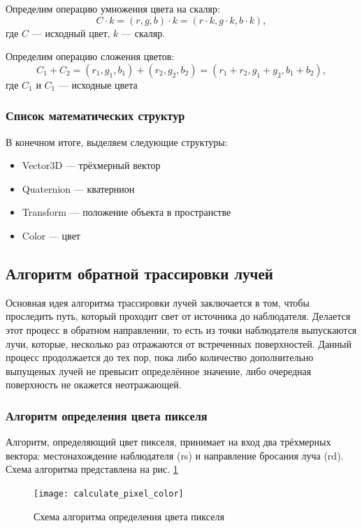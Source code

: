 Определим операцию умножения цвета на скаляр:
\begin{equation}
	C\cdot k=(r, g, b)\cdot k=(r\cdot k, g\cdot k, b\cdot k),
\end{equation}
где $C$ --- исходный цвет, $k$ --- скаляр.

Определим операцию сложения цветов:
\begin{equation}
	C_1+C_2=(r_1, g_1, b_1)+(r_2, g_2, b_2)=(r_1+r_2,g_1+g_2,b_1+b_2),
\end{equation}
где $C_1$ и $C_1$ --- исходные цвета

\subsubsection{Список математических структур}
В конечном итоге, выделяем следующие структуры:
\begin{itemize}
	\item Vector3D --- трёхмерный вектор
	\item Quaternion --- кватернион
	\item Transform --- положение объекта в пространстве
	\item Color --- цвет
\end{itemize}

\subsection{Алгоритм обратной трассировки лучей}
Основная идея алгоритма трассировки лучей заключается в том, чтобы проследить путь, который проходит свет от источника до наблюдателя. Делается этот процесс в обратном направлении, то есть из точки наблюдателя выпускаются лучи, которые, несколько раз отражаются от встреченных поверхностей. Данный процесс продолжается до тех пор, пока либо количество дополнительно выпущеных лучей не превысит определённое значение, либо очередная поверхность не окажется неотражающей.

\subsubsection{Алгоритм определения цвета пикселя}
Алгоритм, определяющий цвет пикселя, принимает на вход два трёхмерных вектора: местонахождение наблюдателя (rs) и направление бросания луча (rd). Схема алгоритма представлена на рис. \ref{fig:calculate_pixel_color}

\begin{figure}[!ht]
	\centering
	\texttt{[image: calculate\_pixel\_color]}
	\caption{Схема алгоритма определения цвета пикселя}
	\label{fig:calculate_pixel_color}
\end{figure}

